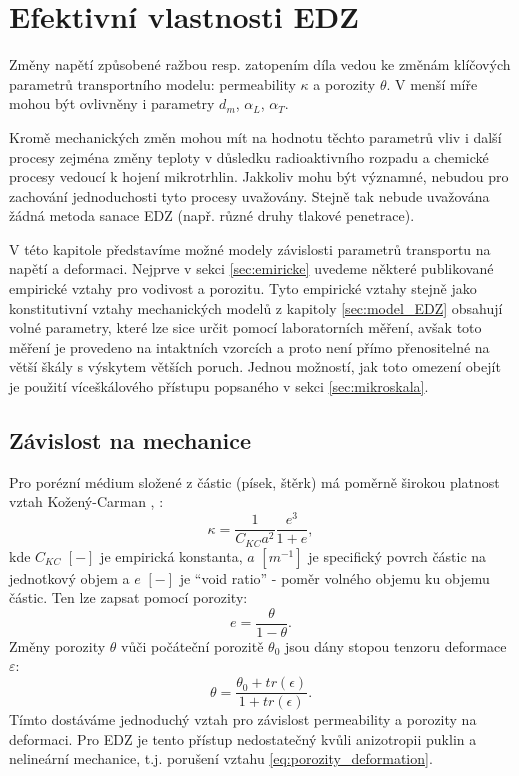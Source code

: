 \documentclass{article}
\def\eps{\varepsilon}
\begin{document}
\section{Efektivní vlastnosti EDZ}
\label{sec:micro_EDZ}
Změny napětí způsobené ražbou resp. zatopením díla vedou ke změnám klíčových parametrů transportního modelu:
permeability $\kappa$ a porozity $\theta$. V menší míře mohou být ovlivněny i parametry $d_m$, $\alpha_L$, $\alpha_T$.

Kromě mechanických změn mohou mít na hodnotu těchto parametrů vliv i další procesy zejména změny teploty v důsledku radioaktivního rozpadu a 
chemické procesy vedoucí k hojení mikrotrhlin. Jakkoliv mohu být významné, nebudou pro zachování jednoduchosti tyto procesy uvažovány.
Stejně tak nebude uvažována žádná metoda sanace EDZ (např. různé druhy tlakové penetrace).

V této kapitole představíme možné modely závislosti parametrů transportu na napětí a deformaci.
Nejprve v sekci \ref{sec:emiricke} uvedeme některé publikované empirické vztahy pro vodivost a porozitu.
Tyto empirické vztahy stejně jako konstitutivní vztahy mechanických modelů z kapitoly \ref{sec:model_EDZ} 
obsahují volné parametry, které lze sice určit pomocí laboratorních měření, avšak toto měření je provedeno na intaktních vzorcích
a proto není přímo přenositelné na větší škály s výskytem větších poruch. Jednou možností, jak toto omezení obejít je
použití víceškálového přístupu popsaného v sekci  \ref{sec:mikroskala}.


\subsection{Závislost na mechanice}
\label{sec:empiricke}

Pro porézní médium složené z částic (písek, štěrk) má poměrně širokou platnost vztah Kožený-Carman \cite{Carman1956}, \cite{Carrier2003}:
\begin{equation}
  \label{eq:Kozeny}
  \kappa = \frac{1}{C_{KC}a^2}\frac{e^3}{1+e},
\end{equation}
kde $C_{KC}$ $[-]$ je empirická konstanta, $a$  $[m^{-1}]$ je specifický povrch částic na jednotkový objem a $e$ $[-]$ je  ``void ratio'' -
poměr volného objemu ku objemu částic. Ten lze zapsat pomocí porozity:
\[
   e = \frac{\theta}{1 - \theta}.
\]
Změny porozity $\theta$ vůči počáteční porozitě $\theta_0$ jsou dány stopou tenzoru deformace $\eps$:
\begin{equation}
   \label{eq:porozity_deformation}
   \theta = \frac{\theta_0 + tr(\epsilon)}{1 + tr(\epsilon)}.
\end{equation}
Tímto dostáváme jednoduchý vztah pro závislost permeability a porozity na deformaci. Pro EDZ je tento přístup nedostatečný kvůli anizotropii
puklin a nelineární mechanice, t.j.  porušení vztahu \eqref{eq:porozity_deformation}.
\end{document}
